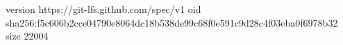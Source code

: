 version https://git-lfs.github.com/spec/v1
oid sha256:f5c606b2cce04790e8064dc18b538de99c68f0e591c9d28c4f03eba0f6978b32
size 22004
